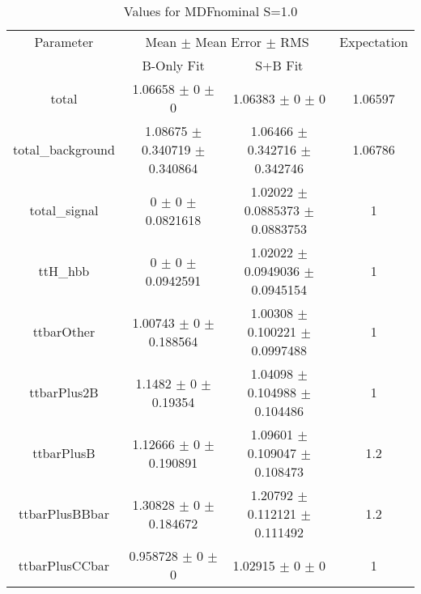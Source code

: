 \begin{table}
\centering
\caption{Values for MDFnominal S=1.0}
\begin{tabular}{cccc}
\toprule
Parameter & \multicolumn{2}{c}{Mean $\pm$ Mean Error $\pm$ RMS} & Expectation\\
 & B-Only Fit & S+B Fit & \\
\midrule
total & \num{1.06658} $\pm$ \num{0} $\pm$ \num{0} & \num{1.06383} $\pm$ \num{0} $\pm$ \num{0} & \num{1.06597}\\
total\_background & \num{1.08675} $\pm$ \num{0.340719} $\pm$ \num{0.340864} & \num{1.06466} $\pm$ \num{0.342716} $\pm$ \num{0.342746} & \num{1.06786}\\
total\_signal & \num{0} $\pm$ \num{0} $\pm$ \num{0.0821618} & \num{1.02022} $\pm$ \num{0.0885373} $\pm$ \num{0.0883753} & \num{1}\\
ttH\_hbb & \num{0} $\pm$ \num{0} $\pm$ \num{0.0942591} & \num{1.02022} $\pm$ \num{0.0949036} $\pm$ \num{0.0945154} & \num{1}\\
ttbarOther & \num{1.00743} $\pm$ \num{0} $\pm$ \num{0.188564} & \num{1.00308} $\pm$ \num{0.100221} $\pm$ \num{0.0997488} & \num{1}\\
ttbarPlus2B & \num{1.1482} $\pm$ \num{0} $\pm$ \num{0.19354} & \num{1.04098} $\pm$ \num{0.104988} $\pm$ \num{0.104486} & \num{1}\\
ttbarPlusB & \num{1.12666} $\pm$ \num{0} $\pm$ \num{0.190891} & \num{1.09601} $\pm$ \num{0.109047} $\pm$ \num{0.108473} & \num{1.2}\\
ttbarPlusBBbar & \num{1.30828} $\pm$ \num{0} $\pm$ \num{0.184672} & \num{1.20792} $\pm$ \num{0.112121} $\pm$ \num{0.111492} & \num{1.2}\\
ttbarPlusCCbar & \num{0.958728} $\pm$ \num{0} $\pm$ \num{0} & \num{1.02915} $\pm$ \num{0} $\pm$ \num{0} & \num{1}\\
\bottomrule
\end{tabular}
\end{table}